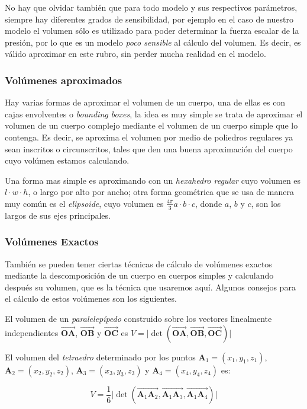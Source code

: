 No hay que olvidar también que para todo modelo y sus respectivos parámetros, siempre hay diferentes grados de sensibilidad, por ejemplo en el caso de nuestro modelo el volumen sólo es utilizado para poder determinar la fuerza escalar de la presión, por lo que es un modelo \emph{poco sensible} al cálculo del volumen.
Es decir, es válido aproximar en este rubro, sin perder mucha realidad en el modelo.

\subsubsection{Volúmenes aproximados}
Hay varias formas de aproximar el volumen de un cuerpo, una de ellas es con cajas envolventes o \emph{\foreignlanguage{english}{bounding boxes}}, la idea es muy simple se trata de aproximar el volumen de un cuerpo complejo mediante el volumen de un cuerpo simple que lo contenga.
Es decir, se aproxima el volumen por medio de poliedros regulares ya sean inscritos o circunscritos, tales que den una buena aproximación del cuerpo cuyo volúmen estamos calculando.

Una forma mas simple es aproximando con un \emph{hexahedro regular} cuyo volumen es $ l \cdot w \cdot h $, o largo por alto por ancho; otra forma geométrica que se usa de manera muy común es el \emph{elipsoide}, cuyo volumen es $ \frac{4\pi}{3} a \cdot   b \cdot  c $, donde $a$, $b$ y $c$, son los largos de sus ejes principales.
\subsubsection{Volúmenes Exactos}
También se pueden tener ciertas técnicas de cálculo de volúmenes exactos mediante la descomposición de un cuerpo en cuerpos simples y calculando después su volumen, que es la técnica que usaremos aquí.
Algunos consejos para el cálculo de estos volúmenes son los siguientes.

El volumen de un \emph{paralelepípedo} construido sobre los vectores linealmente independientes $\overrightarrow{\textbf{OA}}$, $\overrightarrow{\textbf{OB}}$ y $\overrightarrow{\textbf{OC}}$ es $V = \vert \det (\overrightarrow{\textbf{OA}}, \overrightarrow{\textbf{OB}}, \overrightarrow{\textbf{OC}} ) \vert $

El volumen del \emph{tetraedro} determinado por los puntos $\textbf{A}_1 = (x_1, y_1, z_1)$, $\textbf{A}_2 = (x_2, y_2, z_2)$, $\textbf{A}_3 = (x_3, y_3, z_3)$ y $\textbf{A}_4 = (x_4, y_4, z_4)$ es:

$$V = \frac{1}{6} \vert \det ( \overrightarrow{\textbf{A}_1 \textbf{A}_2}, \overrightarrow{\textbf{A}_1 \textbf{A}_3}, \overrightarrow{\textbf{A}_1 \textbf{A}_4} ) \vert$$


